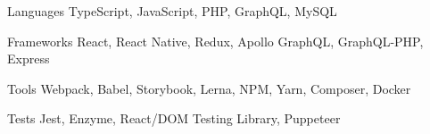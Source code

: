 

\begin{cvskills}

  \cvskill
    {Languages} %
    {TypeScript, JavaScript, PHP, GraphQL, MySQL} %

  \cvskill
    {Frameworks} %
    {React, React Native, Redux, Apollo GraphQL, GraphQL-PHP, Express} %

  \cvskill
    {Tools} %
    {Webpack, Babel, Storybook, Lerna, NPM, Yarn, Composer, Docker} %

  \cvskill
    {Tests} %
    {Jest, Enzyme, React/DOM Testing Library, Puppeteer} %

\end{cvskills}
